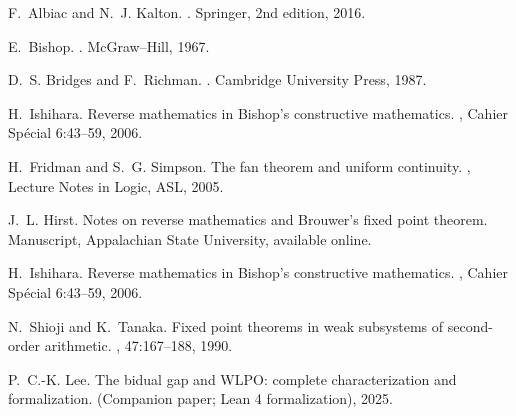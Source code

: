 \documentclass[11pt]{article}
\theoremstyle{definition}
\theoremstyle{remark}
\begin{document}

\begin{thebibliography}{10}

F.~Albiac and N.~J. Kalton.
.
\newblock Springer, 2nd edition, 2016.

E.~Bishop.
.
\newblock McGraw--Hill, 1967.

D.~S. Bridges and F.~Richman.
.
\newblock Cambridge University Press, 1987.

H.~Ishihara.
\newblock Reverse mathematics in {B}ishop's constructive mathematics.
, Cahier Sp\'ecial 6:43--59, 2006.


H.~Fridman and S.~G. Simpson.
\newblock The fan theorem and uniform continuity.
, Lecture Notes in Logic, ASL, 2005.

J.~L. Hirst.
\newblock Notes on reverse mathematics and {B}rouwer's fixed point theorem.
\newblock Manuscript, Appalachian State University, available online.

H.~Ishihara.
\newblock Reverse mathematics in {B}ishop's constructive mathematics.
, Cahier Sp\'ecial 6:43--59, 2006.

N.~Shioji and K.~Tanaka.
\newblock Fixed point theorems in weak subsystems of second-order arithmetic.
, 47:167--188, 1990.

P.~C.-K. Lee.
\newblock The bidual gap and {WLPO}: complete characterization and
  formalization.
\newblock (Companion paper; Lean 4 formalization), 2025.

\end{thebibliography}
\end{document}
